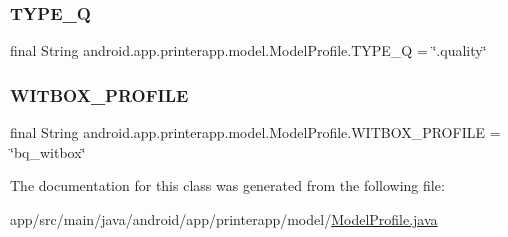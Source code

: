 \subsubsection{\texorpdfstring{T\+Y\+P\+E\+\_\+Q}{TYPE\_Q}}
{\footnotesize\ttfamily final String android.\+app.\+printerapp.\+model.\+Model\+Profile.\+T\+Y\+P\+E\+\_\+Q = \char`\"{}.quality\char`\"{}\hspace{0.3cm}{\ttfamily [static]}}

\mbox{\label{classandroid_1_1app_1_1printerapp_1_1model_1_1_model_profile_ae723c547d1041b6bb11f585c7af60dac}} 
\subsubsection{\texorpdfstring{W\+I\+T\+B\+O\+X\+\_\+\+P\+R\+O\+F\+I\+LE}{WITBOX\_PROFILE}}
{\footnotesize\ttfamily final String android.\+app.\+printerapp.\+model.\+Model\+Profile.\+W\+I\+T\+B\+O\+X\+\_\+\+P\+R\+O\+F\+I\+LE = \char`\"{}bq\+\_\+witbox\char`\"{}\hspace{0.3cm}{\ttfamily [static]}}



The documentation for this class was generated from the following file\+:\begin{DoxyCompactItemize}
\item 
app/src/main/java/android/app/printerapp/model/\hyperlink{_model_profile_8java}{Model\+Profile.\+java}\end{DoxyCompactItemize}
